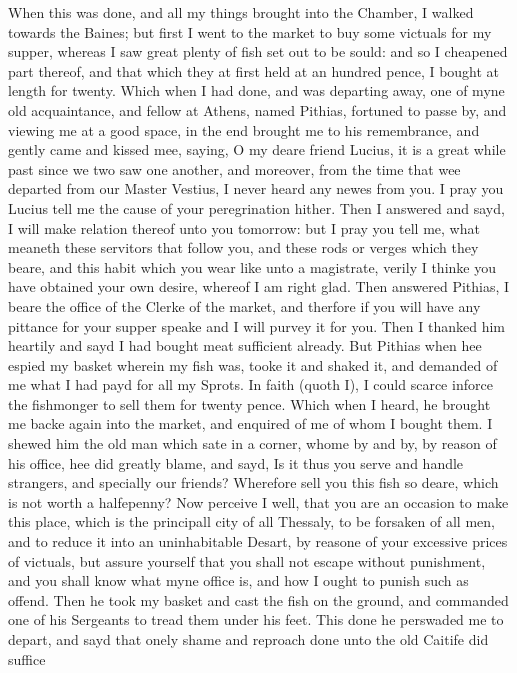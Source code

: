 When this was done, and all my things brought into the Chamber, I walked
towards the Baines; but first I went to the market to buy some victuals for my
supper, whereas I saw great plenty of fish set out to be sould: and so I
cheapened part thereof, and that which they at first held at an hundred pence,
I bought at length for twenty. Which when I had done, and was departing away,
one of myne old acquaintance, and fellow at Athens, named Pithias, fortuned to
passe by, and viewing me at a good space, in the end brought me to his
remembrance, and gently came and kissed mee, saying, O my deare friend Lucius,
it is a great while past since we two saw one another, and moreover, from the
time that wee departed from our Master Vestius, I never heard any newes from
you. I pray you Lucius tell me the cause of your peregrination hither. Then I
answered and sayd, I will make relation thereof unto you tomorrow: but I pray
you tell me, what meaneth these servitors that follow you, and these rods or
verges which they beare, and this habit which you wear like unto a magistrate,
verily I thinke you have obtained your own desire, whereof I am right glad.
Then answered Pithias, I beare the office of the Clerke of the market, and
therfore if you will have any pittance for your supper speake and I will purvey
it for you. Then I thanked him heartily and sayd I had bought meat sufficient
already. But Pithias when hee espied my basket wherein my fish was, tooke it
and shaked it, and demanded of me what I had payd for all my Sprots. In faith
(quoth I), I could scarce inforce the fishmonger to sell them for twenty pence.
Which when I heard, he brought me backe again into the market, and enquired of
me of whom I bought them. I shewed him the old man which sate in a corner,
whome by and by, by reason of his office, hee did greatly blame, and sayd, Is
it thus you serve and handle strangers, and specially our friends? Wherefore
sell you this fish so deare, which is not worth a halfepenny? Now perceive I
well, that you are an occasion to make this place, which is the principall city
of all Thessaly, to be forsaken of all men, and to reduce it into an
uninhabitable Desart, by reasone of your excessive prices of victuals, but
assure yourself that you shall not escape without punishment, and you shall
know what myne office is, and how I ought to punish such as offend. Then he
took my basket and cast the fish on the ground, and commanded one of his
Sergeants to tread them under his feet. This done he perswaded me to depart,
and sayd that onely shame and reproach done unto the old Caitife did suffice
